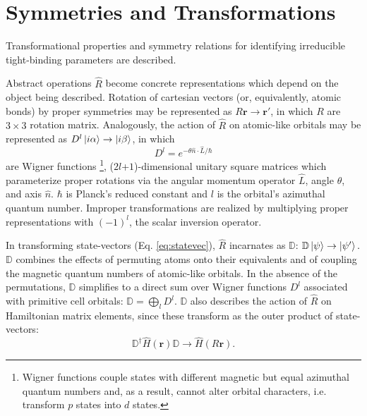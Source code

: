 \documentclass[twocolumn,showpacs,preprintnumbers,superscriptaddress,prb,floatfix,aps,10pt]{revtex4-1}
\renewcommand{\vec}[1]{\ensuremath{\mathbf{#1}}}
\newcommand*{\ham}{\hat{H}}
\newcommand*{\wignerD}{\mathbb{D}}%
\newcommand*{\wignerDl}{D^{l}}%
\begin{document}
\section{Symmetries and Transformations}
Transformational properties and symmetry relations for identifying irreducible tight-binding parameters are described. 

Abstract operations $\hat{R}$ become concrete representations which depend on the object being described. Rotation of cartesian vectors (or, equivalently, atomic bonds) by proper symmetries may be represented as $ R \vec{r} \rightarrow \vec{r} '$, in which $R$ are $3\times3$ rotation matrix. Analogously, the action of $\hat{R}$ on atomic-like orbitals may be represented as $\wignerDl\ket{i\alpha} \rightarrow \ket{i\beta}$, in which 
\begin{equation}
\wignerDl = e^{- \theta \hat{n} \cdot \hat{L} /\hbar}
\end{equation}
are Wigner functions \footnote{Wigner functions couple states with different magnetic but equal azimuthal quantum numbers and, as a result, cannot alter orbital characters, i.e. transform $p$ states into $d$ states.}, ($2l$+$1$)-dimensional unitary square matrices which parameterize proper rotations via the angular momentum operator $\hat{L}$, angle $\theta$, and axis $\hat{n}$. $\hbar$ is Planck's reduced constant and $l$ is the orbital's azimuthal quantum number. Improper transformations are realized by multiplying proper representations with $(-1)^l$, the scalar inversion operator.\cite{sharma_general_1979,el-batanouny_symmetry_2008} %

In transforming state-vectors (Eq. \ref{eq:statevec}), $\hat{R}$ incarnates as $\wignerD$: $\wignerD \ket{\psi} \rightarrow \ket{\psi'}.$ $\wignerD$ combines the effects of permuting atoms onto their equivalents and of coupling the magnetic quantum numbers of atomic-like orbitals. In the absence of the permutations, $\wignerD$ simplifies to a direct sum over Wigner functions $\wignerDl$ associated with primitive cell orbitals: $\wignerD = \bigoplus_l \wignerDl$. $\wignerD$ also describes the action of $\hat{R}$ on Hamiltonian matrix elements, since these transform as the outer product of state-vectors:\cite{el-batanouny_symmetry_2008}
\begin{equation}
\label{eq:transformation_matrix}
\mathbb{D}^\dag \ham(\vec{r}) \wignerD \rightarrow \ham( R\vec{r}).
\end{equation}
\end{document}
